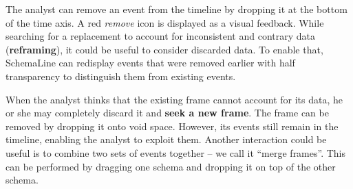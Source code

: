The analyst can remove an event from the timeline by dropping it at the bottom of the time axis. A red \emph{remove} icon is displayed as a visual feedback. While searching for a replacement to account for inconsistent and contrary data (\textbf{reframing}), it could be useful to consider discarded data. To enable that, SchemaLine can redisplay events that were removed earlier with half transparency to distinguish them from existing events.

When the analyst thinks that the existing frame cannot account for its data, he or she may  completely discard it and \textbf{seek a new frame}. The frame can be removed by dropping it onto void space. However, its events still remain in the timeline, enabling the analyst to exploit them. Another interaction could be useful is to combine two sets of events together -- we call it ``merge frames''. This can be performed by dragging one schema and dropping it on top of the other schema.